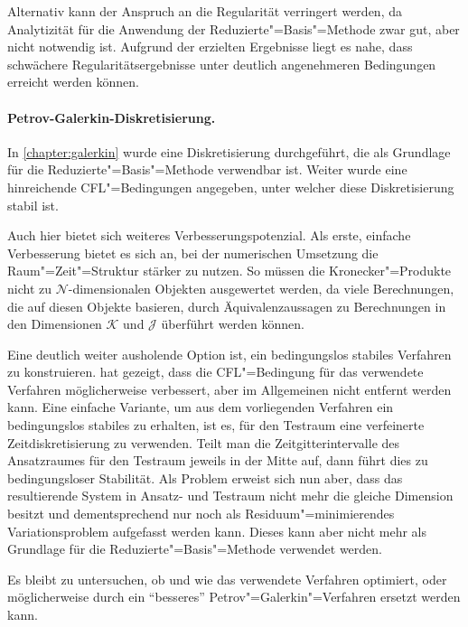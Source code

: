 \documentclass[../main.tex]{subfiles}
\begin{document}
Alternativ kann der Anspruch an die Regularität verringert werden, da Analytizität für die Anwendung der Reduzierte"=Basis"=Methode zwar gut, aber nicht notwendig ist.
Aufgrund der erzielten Ergebnisse liegt es nahe, dass schwächere Regularitätsergebnisse unter deutlich angenehmeren Bedingungen erreicht werden können.

\paragraph{Petrov-Galerkin-Diskretisierung.} %
\label{par:petrov_galerkin_diskretisierung}

In \cref{chapter:galerkin} wurde eine Diskretisierung durchgeführt, die als Grundlage für die Reduzierte"=Basis"=Methode verwendbar ist.
Weiter wurde eine hinreichende CFL"=Bedingungen angegeben, unter welcher diese Diskretisierung stabil ist.

Auch hier bietet sich weiteres Verbesserungspotenzial.
Als erste, einfache Verbesserung bietet es sich an, bei der numerischen Umsetzung die Raum"=Zeit"=Struktur stärker zu nutzen.
So müssen die Kronecker"=Produkte nicht zu $\mathcal N$-dimensionalen Objekten ausgewertet werden, da viele Berechnungen, die auf diesen Objekte basieren, durch Äquivalenzaussagen zu Berechnungen in den Dimensionen $\mathcal K$ und $\mathcal J$ überführt werden können.

Eine deutlich weiter ausholende Option ist, ein bedingungslos stabiles Verfahren zu konstruieren.
\textcite[Section 5.2]{Andreev:2012ep} hat gezeigt, dass die CFL"=Bedingung für das verwendete Verfahren möglicherweise verbessert, aber im Allgemeinen nicht entfernt werden kann.
Eine einfache Variante, um aus dem vorliegenden Verfahren ein bedingungslos stabiles zu erhalten, ist es, für den Testraum eine verfeinerte Zeitdiskretisierung zu verwenden.
Teilt man die Zeitgitterintervalle des Ansatzraumes für den Testraum jeweils in der Mitte auf, dann führt dies zu bedingungsloser Stabilität.
Als Problem erweist sich nun aber, dass das resultierende System in Ansatz- und Testraum nicht mehr die gleiche Dimension besitzt und dementsprechend nur noch als Residuum"=minimierendes Variationsproblem aufgefasst werden kann.
Dieses kann aber nicht mehr als Grundlage für die Reduzierte"=Basis"=Methode verwendet werden.

Es bleibt zu untersuchen, ob und wie das verwendete Verfahren optimiert, oder möglicherweise durch ein \enquote{besseres} Petrov"=Galerkin"=Verfahren ersetzt werden kann.
\end{document}
